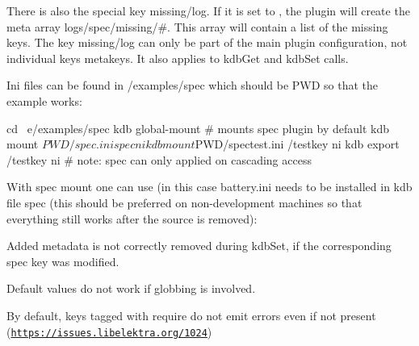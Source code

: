 There is also the special key {\ttfamily missing/log}. If it is set to {}, the plugin will create the meta array {\ttfamily logs/spec/missing/\#}. This array will contain a list of the missing keys. The key {\ttfamily missing/log} can only be part of the main plugin configuration, not individual keys\textquotesingle{} metakeys. It also applies to {\ttfamily kdb\+Get} and {\ttfamily kdb\+Set} calls.

Ini files can be found in /examples/spec which should be P\+WD so that the example works\+:


\begin{DoxyCode}
cd ~e/examples/spec
kdb global-mount        # mounts spec plugin by default
kdb mount $PWD/spec.ini spec ni
kdb mount $PWD/spectest.ini /testkey ni
kdb export /testkey ni     # note: spec can only applied on cascading access
\end{DoxyCode}


With spec mount one can use (in this case battery.\+ini needs to be installed in {\ttfamily kdb file spec} (this should be preferred on non-\/development machines so that everything still works after the source is removed)\+:





\begin{DoxyItemize}
\item Added metadata is not correctly removed during {\ttfamily kdb\+Set}, if the corresponding spec key was modified.
\item Default values do not work if globbing is involved.
\item By default, keys tagged with {\ttfamily require} do not emit errors even if not present (\href{https://issues.libelektra.org/1024}{\tt https\+://issues.\+libelektra.\+org/1024}) 
\end{DoxyItemize}